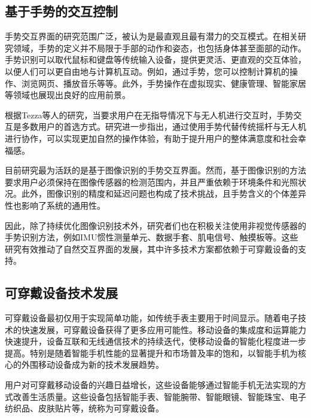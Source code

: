 \subsection{基于手势的交互控制}

手势交互界面的研究范围广泛，被认为是最直观且最有潜力的交互模式。在相关研究领域，手势的定义并不局限于手部的动作和姿态，也包括身体甚至面部的动作\cite{wu2024gesture}。手势识别可以取代鼠标\cite{prasanth2023gesture}和键盘等传统输入设备，提供更灵活、更直观的交互体验，以便人们可以更自由地与计算机互动。例如，通过手势，您可以控制计算机的操作、浏览网页、播放音乐\cite{clement2021musical}等等。此外，手势操作在虚拟现实、健康管理、智能家居等领域也展现出良好的应用前景\cite{wu2024gesture}。

根据Tezza等人\cite{tezza2019state}的研究，当要求用户在无指导情况下与无人机进行交互时，手势交互是多数用户的首选方式。研究进一步指出，通过使用手势代替传统摇杆与无人机进行协作，可以实现更加自然的操作体验，有助于提升用户的整体满意度和社会幸福感。

目前研究最为活跃的是基于图像识别的手势交互界面\cite{mughees2020gesture,蔡成林0基于视觉,赫闻阳2020基于视觉,黑振全2022基于手势}。然而，基于图像识别的方法要求用户必须保持在图像传感器的检测范围内，并且严重依赖于环境条件和光照状况。此外，图像识别的精度和延迟问题也构成了技术挑战，且手势含义的个体差异性也影响了系统的通用性。

因此，除了持续优化图像识别技术外，研究者们也在积极关注使用非视觉传感器的手势识别方法，例如IMU惯性测量单元\cite{yau2020subtle,lee2023wearable,yoo2022motion}、数据手套\cite{bello2023captainglove,muezzinouglu2021intelligent}、肌电信号\cite{zheng2022surface}、触摸板\cite{yau2020subtle}等。这些研究有效推动了自然交互界面的发展，其中许多技术方案都依赖于可穿戴设备的支持。

\subsection{可穿戴设备技术发展}

可穿戴设备最初仅用于实现简单功能，如传统手表主要用于时间显示。随着电子技术的快速发展，可穿戴设备获得了更多应用可能性。移动设备的集成度和运算能力快速提升，设备互联和无线通信技术的持续迭代，使移动设备的智能化程度进一步提高。特别是随着智能手机性能的显著提升和市场普及率的饱和，以智能手机为核心的外围移动设备成为新的技术发展趋势。

用户对可穿戴移动设备的兴趣日益增长，这些设备能够通过智能手机无法实现的方式改善生活质量。这些设备包括智能手表、智能腕带、智能眼镜、智能珠宝、电子纺织品、皮肤贴片等，统称为可穿戴设备\cite{seneviratne2017survey}。

